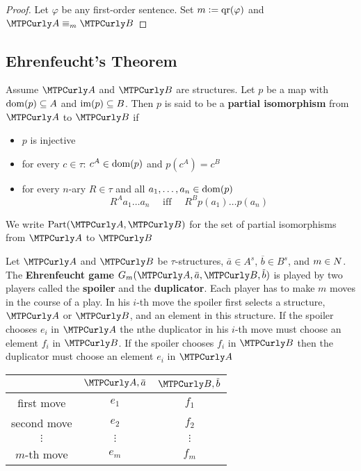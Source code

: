 \documentclass[11pt]{article}
\begin{document}
\begin{proof}
Let \(\varphi\) be any first-order sentence. Set \(m:=\operatorname{qr}(\varphi)\) and \(\cala\equiv_m\calb\)
\end{proof}

\subsection{Ehrenfeucht's Theorem}
\label{sec:org5b44346}
\begin{definition}[]
Assume \(\cala\) and \(\calb\) are structures. Let \(p\) be a map with
\(\operatorname{dom}(p)\subseteq A\) and \(\operatorname{im}(p)\subseteq B\). Then \(p\) is said to be a
\textbf{partial isomorphism} from \(\cala\) to \(\calb\) if
\begin{itemize}
\item \(p\) is injective
\item for every \(c\in\tau\): \(c^A\in\operatorname{dom}(p)\) and \(p(c^A)=c^B\)
\item for every \(n\)-ary \(R\in\tau\) and all \(a_1,\dots,a_n\in\operatorname{dom}(p)\)
\begin{equation*}
R^Aa_1\dots a_n \quad\text{ iff }\quad R^Bp(a_1)\dots p(a_n)
\end{equation*}
\end{itemize}


We write \(\Part(\cala,\calb)\) for the set of partial isomorphisms from
\(\cala\) to \(\calb\)
\end{definition}


Let \(\cala\) and \(\calb\) be \(\tau\)-structures, \(\bar{a}\in A^s\),
\(\overbar{b}\in B^s\), and \(m\in\relax{N}\). The \textbf{Ehrenfeucht game}
\(G_m(\cala,\overbar{a},\calb,\overbar{b})\) is played by two players called
the \textbf{spoiler} and the \textbf{duplicator}. Each player has to make \(m\) moves in
the course of a play. In his \(i\)-th move the spoiler first selects a
structure, \(\cala\) or \(\calb\), and an element in this structure. If the
spoiler chooses \(e_i\) in \(\cala\) the nthe duplicator in his \(i\)-th move
must choose an element \(f_i\) in \(\calb\). If the spoiler chooses \(f_i\)
in \(\calb\) then the duplicator must choose an element \(e_i\) in \(\cala\)

\begin{center}
\begin{tabular}{cc|c}
 & \(\cala,\overbar{a}\) & \(\calb,\overbar{b}\)\\
\hline
first move & \(e_1\) & \(f_1\)\\
second move & \(e_2\) & \(f_2\)\\
\(\vdots\) & \(\vdots\) & \(\vdots\)\\
\(m\)-th move & \(e_m\) & \(f_m\)\\
\end{tabular}
\end{center}
\end{document}
